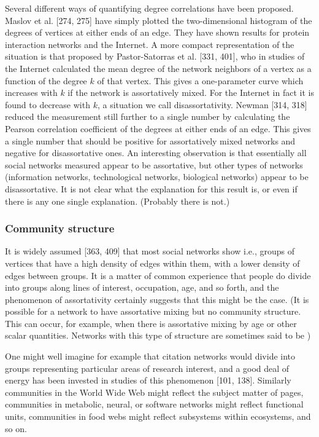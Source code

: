       Several different ways of quantifying degree correlations have been proposed. Maslov et al. [274, 275] have simply plotted the two-dimensional histogram of the degrees of vertices at either ends of an edge. They have shown results for protein interaction networks and the Internet. A more compact representation of the situation is that proposed by Pastor-Satorras et al. [331, 401], who in studies of the Internet calculated the mean degree of the network neighbors of a vertex as a function of the degree $k$ of that vertex. This gives a one-parameter curve which increases with $k$ if the network is assortatively mixed. For the Internet in fact it is found to decrease with $k$, a situation we call disassortativity. Newman [314, 318] reduced the measurement still further to a single number by calculating the Pearson correlation coefficient of the degrees at either ends of an edge. This gives a single number that should be positive for assortatively mixed networks and negative for disassortative ones. An interesting observation is that essentially all social networks measured appear to be assortative, but other types of networks (information networks, technological networks, biological networks) appear to be disassortative. It is not clear what the explanation for this result is, or even if there is any one single explanation. (Probably there is not.)
    
    \subsubsection{Community structure}
    
      It is widely assumed [363, 409] that most social networks show  i.e., groups of vertices that have a high density of edges within them, with a lower density of edges between groups. It is a matter of common experience that people do divide into groups along lines of interest, occupation, age, and so forth, and the phenomenon of assortativity certainly suggests that this might be the case. (It is possible for a network to have assortative mixing but no community structure. This can occur, for example, when there is assortative mixing by age or other scalar quantities. Networks with this type of structure are sometimes said to be )
    
      One might well imagine for example that citation networks would divide into groups representing particular areas of research interest, and a good deal of energy has been invested in studies of this phenomenon [101, 138]. Similarly communities in the World Wide Web might reflect the subject matter of pages, communities in metabolic, neural, or software networks might reflect functional units, communities in food webs might reflect subsystems within ecosystems, and so on.
      
